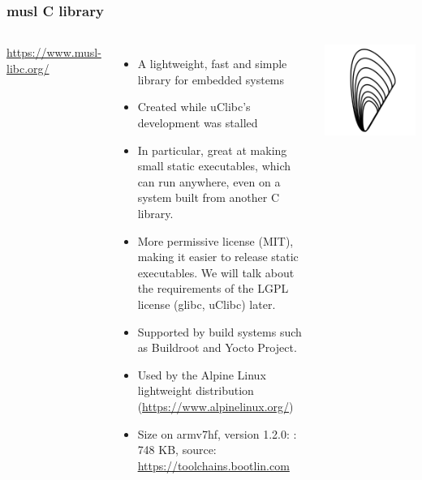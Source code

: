 \begin{frame}
  \frametitle{musl C library}
  \begin{columns}
      \url{https://www.musl-libc.org/}
      \begin{itemize}
      \item A lightweight, fast and simple library for embedded systems
      \item Created while uClibc's development was stalled
      \item In particular, great at making small static executables,
	    which can run anywhere, even on a system built
            from another C library.
      \item More permissive license (MIT), making it easier to release
            static executables. We will talk about the requirements
            of the LGPL license (glibc, uClibc) later.
      \item Supported by build systems such as Buildroot and Yocto
        Project.
      \item Used by the Alpine Linux lightweight distribution
        (\url{https://www.alpinelinux.org/})
      \item Size on armv7hf, version 1.2.0:
        : 748 KB, source: \url{https://toolchains.bootlin.com}
      \end{itemize}
    \includegraphics[width=\textwidth]{slides/sysdev-toolchains-definition/musl.png}
  \end{columns}
\end{frame}

